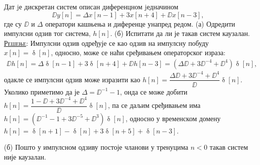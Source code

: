 \PID Дат jе дискретан систем описан диференцном jедначином
\begin{equation}
    \DD y[n] = \Delta x[n - 1] + 3x[n + 4] + \DD x[n - 3],
\end{equation}
где су $\DD$ и $\Delta$ 
оператори кашњења и диференце унапред редом. 
(а) Одредити импулсни одзив тог система, $h[n]$.
(б) Испитати да ли је такав систем каузалан.
\\[2mm]

\textsc{\underline{Решење}}: Импулсни одзив одређује се као одзив на 
импулсну побуду $x[n] = \updelta[n]$, 
односно, може се наћи сређивањем операторског израза:
\begin{align}
    \DD h[n] 
    = \Delta \updelta[n - 1] + 3\updelta[n + 4] + \DD h[n - 3] 
    = (\Delta\DD + 3 \DD^{-4} + \DD^{4})\updelta[n],
\end{align}
одакле се импулсни одзив може изразити као 
$h[n] = \dfrac{\Delta\DD + 3 \DD^{-4} + \DD^{4}}{\DD} \updelta[n]$.
Уколико приметимо да је $\Delta = \DD^{-1} - 1$, онда се може добити 
$h[n] = \dfrac{ 1 - \DD + 3\DD^{-4} + \DD^4 }{\DD} \updelta[n]$, па се 
даљим сређивањем има 
$h[n] = (\DD^{-1} - 1 + 3\DD^{-5} + \DD^3) \updelta[n]$, односно у временском домену
$h[n] = \updelta[n + 1] - \updelta[n] + 3\updelta[n + 5] + \updelta[n - 3]$.

(б) Пошто у импулсном одзиву постоје чланови у тренуцима $n < 0$ 
такав систем није каузалан.

